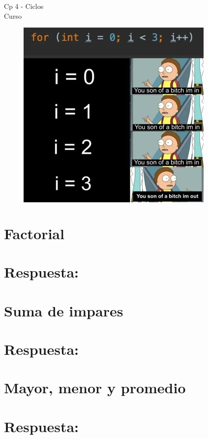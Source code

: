 \begin{center}
    \begin{large}
    Cp 4 - Ciclos\\
    Curso \academicyear\\
    \end{large}
    \begin{figure}[h]
    	\centering
    	\includegraphics[width=0.5\linewidth]{cp4/loops.jpg}
    \end{figure}
\end{center}

\section{Factorial}

\ifshowanswers
\section*{Respuesta:}

\fi

\section{Suma de impares}

\ifshowanswers
\section*{Respuesta:}

\fi

\section{Mayor, menor y promedio}

\ifshowanswers
\section*{Respuesta:}

\fi

